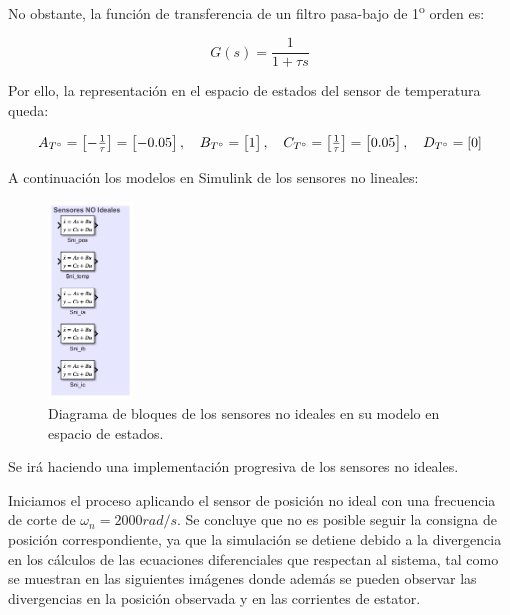 \documentclass{article}
\begin{document}
No obstante, la funci\'on de transferencia de un filtro pasa-bajo de 1\textsuperscript{o} orden es:

\begin{equation}
    G(s) = \frac{1}{1 + \tau s}
\end{equation}

Por ello, la representaci\'on en el espacio de estados del sensor de temperatura queda:

\begin{equation}
    A_{T\degree} = \begin{bmatrix} -\frac{1}{\tau} \end{bmatrix} = \begin{bmatrix} -0.05 \end{bmatrix}, \quad B_{T\degree} = \begin{bmatrix} 1 \end{bmatrix}, \quad 
    C_{T\degree} = \begin{bmatrix} \frac{1}{\tau} \end{bmatrix} = \begin{bmatrix} 0.05 \end{bmatrix}, \quad D_{T\degree} = [0]
\end{equation}

A continuación los modelos en Simulink de los sensores no lineales:

\begin{figure}[H]
    \centering
    \includegraphics[width=0.2\textwidth]{Imagenes/sensores_no_ideales.png}
    \caption{Diagrama de bloques de los sensores no ideales en su modelo en espacio de estados.}
\end{figure}


Se irá haciendo una implementación progresiva de los sensores no ideales. 

Iniciamos el proceso aplicando el sensor de posición no ideal con una frecuencia de corte de $\omega_n = 2000 rad/s$. Se concluye que no es posible seguir la consigna de posición correspondiente, ya que la simulación se detiene debido a la divergencia en los cálculos de las ecuaciones diferenciales que respectan al sistema, tal como se muestran en las siguientes imágenes donde además se pueden observar las divergencias en la posición observada y en las corrientes de estator.
\end{document}
